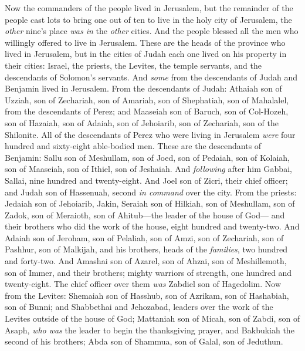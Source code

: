 \begin{biblechapter} %
 Now the commanders of the people lived in Jerusalem, but the remainder of the people cast lots to bring one out of ten to live in the holy city of Jerusalem, the \textit{other} nine’s place \textit{was in} the \textit{other} cities.
\verse And the people blessed all the men who willingly offered to live in Jerusalem.
\verse These are the heads of the province who lived in Jerusalem, but in the cities of Judah each one lived on his property in their cities: Israel, the priests, the Levites, the temple servants, and the descendants of Solomon’s servants.
\verse And \textit{some} from the descendants of Judah and Benjamin lived in Jerusalem. From the descendants of Judah: Athaiah son of Uzziah, son of Zechariah, son of Amariah, son of Shephatiah, son of Mahalalel, from the descendants of Perez;
\verse and Maaseiah son of Baruch, son of Col-Hozeh, son of Hazaiah, son of Adaiah, son of Jehoiarib, son of Zechariah, son of the Shilonite.
\verse All of the descendants of Perez who were living in Jerusalem \textit{were} four hundred and sixty-eight able-bodied men.
\verse These are the descendants of Benjamin: Sallu son of Meshullam, son of Joed, son of Pedaiah, son of Kolaiah, son of Maaseiah, son of Ithiel, son of Jeshaiah.
\verse And \textit{following} after him Gabbai, Sallai, nine hundred and twenty-eight.
\verse And Joel son of Zicri, their chief officer; and Judah son of Hassenuah, second \textit{in command} over the city.
\verse From the priests: Jedaiah son of Jehoiarib, Jakin,
\verse Seraiah son of Hilkiah, son of Meshullam, son of Zadok, son of Meraioth, son of Ahitub—the leader of the house of God—
\verse and their brothers who did the work of the house, eight hundred and twenty-two. And Adaiah son of Jeroham, son of Pelaliah, son of Amzi, son of Zechariah, son of Pashhur, son of Malkijah,
\verse and his brothers, heads of the \textit{families}, two hundred and forty-two. And Amashai son of Azarel, son of Ahzai, son of Meshillemoth, son of Immer,
\verse and their brothers; mighty warriors of strength, one hundred and twenty-eight. The chief officer over them \textit{was} Zabdiel son of Hagedolim.
\verse Now from the Levites: Shemaiah son of Hasshub, son of Azrikam, son of Hashabiah, son of Bunni;
\verse and Shabbethai and Jehozabad, leaders over the work of the Levites outside of the house of God;
\verse Mattaniah son of Micah, son of Zabdi, son of Asaph, \textit{who was} the leader to begin the thanksgiving prayer, and Bakbukiah the second of his brothers; Abda son of Shammua, son of Galal, son of Jeduthun.

\end{biblechapter}
